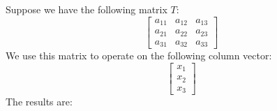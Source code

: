         Suppose we have the following matrix $T$:
                    \begin{equation}
                        \begin{bmatrix}
                            a_{11} & a_{12} & a_{13}\\
                            a_{21} & a_{22} & a_{23}\\
                            a_{31} & a_{32} & a_{33}
                        \end{bmatrix}
                    \end{equation}
        We use this matrix to operate on the following column vector:
             \begin{equation}
                    \begin{bmatrix}
                            x_1\\
                            x_2\\
                            x_3
                    \end{bmatrix}
            \end{equation}
        The results are:
